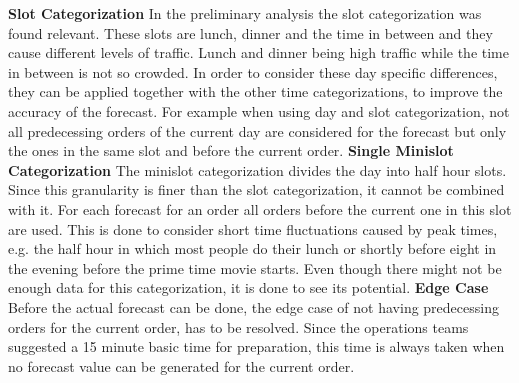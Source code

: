 \newline\newline\textbf{Slot Categorization}\newline
In the preliminary analysis the slot categorization was found relevant. These slots are lunch, dinner and the time in between and they cause different levels of traffic. Lunch and dinner being high traffic while the time in between is not so crowded. In order to consider these day specific differences, they can be applied together with the other time categorizations, to improve the accuracy of the forecast. For example when using day and slot categorization, not all predecessing orders of the current day are considered for the forecast but only the ones in the same slot and before the current order.
\newline\newline\textbf{Single Minislot Categorization}\newline
The minislot categorization divides the day into half hour slots. Since this granularity is finer than the slot categorization, it cannot be combined with it. For each forecast for an order all orders before the current one in this slot are used. This is done to consider short time fluctuations caused by peak times, e.g. the half hour in which most people do their lunch or shortly before eight in the evening before the prime time movie starts.\newline
Even though there might not be enough data for this categorization, it is done to see its potential.
\newline\newline\textbf{Edge Case}\newline
Before the actual forecast can be done, the edge case of not having predecessing orders for the current order, has to be resolved. Since the operations teams suggested a 15 minute basic time for preparation, this time is always taken when no forecast value can be generated for the current order.

